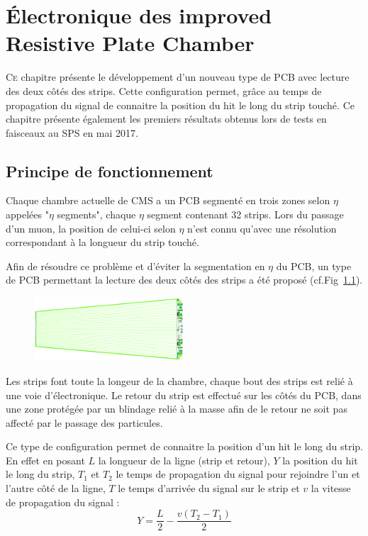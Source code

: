 \chapter{Électronique des improved Resistive Plate Chamber}
\label{time}
\renewcommand\chapterillustration{ELE/ele}
\ThisULCornerWallPaper{1}{\chapterillustration}
\minitoc

\lettrine[lines=4, slope=-0.5em]{C}{e} chapitre présente le développement d'un nouveau type de PCB avec lecture des deux côtés des strips. Cette configuration permet, grâce au temps de propagation du signal de connaitre la position du hit le long du strip touché. Ce chapitre présente également les premiers résultats obtenus lors de tests en faisceaux au SPS en mai 2017.

\section{Principe de fonctionnement}
\vspace{-0.5cm}
Chaque chambre actuelle de CMS a un PCB segmenté en trois zones selon $\eta$ appelées "$\eta$ segments", chaque $\eta$ segment contenant \num{32} strips. Lors du passage d'un muon, la position de celui-ci selon $\eta$ n'est connu qu'avec une résolution correspondant à la longueur du strip touché.

Afin de résoudre ce problème et d'éviter la segmentation en $\eta$ du PCB, un type de PCB permettant la lecture des deux côtés des strips a été proposé (cf.Fig~\ref{PCB1}).
\vspace*{-0.5cm}
\begin{figure}[ht!]
	\centering
	\includegraphics[width=0.50\textwidth]{ELE/PCB1.png}
	\label{PCB1}
\end{figure}
\vspace{-0.3cm}
Les strips font toute la longeur de la chambre, chaque bout des strips est relié à une voie d'électronique. Le retour du strip est effectué sur les côtés du PCB, dans une zone protégée par un blindage relié à la masse afin de le retour ne soit pas affecté par le passage des particules.

Ce type de configuration permet de connaitre la position d'un hit le long du strip. En effet en posant $L$ la longueur de la ligne (strip et retour), $Y$ la position du hit le long du strip, $T_1$ et $T_2$ le temps de propagation du signal pour rejoindre l'un et l'autre côté de la ligne, $T$ le temps d'arrivée du signal sur le strip et $v$ la vitesse de propagation du signal :
\begin{equation}
\label{eqqq}
Y=\frac{L}{2}-\frac{v(T_2-T_1)}{2}
\end{equation} 

